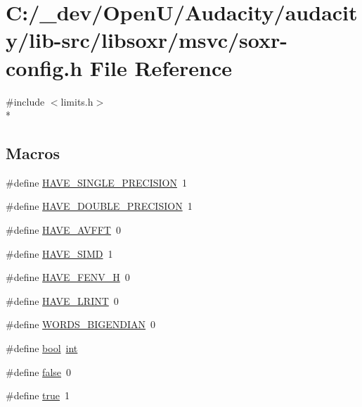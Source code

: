 \hypertarget{lib-src_2libsoxr_2msvc_2soxr-config_8h}{}\section{C\+:/\+\_\+dev/\+Open\+U/\+Audacity/audacity/lib-\/src/libsoxr/msvc/soxr-\/config.h File Reference}
\label{lib-src_2libsoxr_2msvc_2soxr-config_8h}
{\ttfamily \#include $<$limits.\+h$>$}\\*
\subsection*{Macros}
\begin{DoxyCompactItemize}
\item 
\#define \hyperlink{lib-src_2libsoxr_2msvc_2soxr-config_8h_a7d5257b242a6369603f16dca5e23969a}{H\+A\+V\+E\+\_\+\+S\+I\+N\+G\+L\+E\+\_\+\+P\+R\+E\+C\+I\+S\+I\+ON}~1
\item 
\#define \hyperlink{lib-src_2libsoxr_2msvc_2soxr-config_8h_a95431831c0c6db38c5cff6de1850b117}{H\+A\+V\+E\+\_\+\+D\+O\+U\+B\+L\+E\+\_\+\+P\+R\+E\+C\+I\+S\+I\+ON}~1
\item 
\#define \hyperlink{lib-src_2libsoxr_2msvc_2soxr-config_8h_a126b1684b376fc1fd71e169a46bcb3da}{H\+A\+V\+E\+\_\+\+A\+V\+F\+FT}~0
\item 
\#define \hyperlink{lib-src_2libsoxr_2msvc_2soxr-config_8h_a0b8fb21213538acb85ca7075fbc8cea3}{H\+A\+V\+E\+\_\+\+S\+I\+MD}~1
\item 
\#define \hyperlink{lib-src_2libsoxr_2msvc_2soxr-config_8h_a252d609defabf0144cfb8556051c2689}{H\+A\+V\+E\+\_\+\+F\+E\+N\+V\+\_\+H}~0
\item 
\#define \hyperlink{lib-src_2libsoxr_2msvc_2soxr-config_8h_a2bc3bc313571661387f686459daa7869}{H\+A\+V\+E\+\_\+\+L\+R\+I\+NT}~0
\item 
\#define \hyperlink{lib-src_2libsoxr_2msvc_2soxr-config_8h_a82e69009d3cd108c8aad8afe44fb1132}{W\+O\+R\+D\+S\+\_\+\+B\+I\+G\+E\+N\+D\+I\+AN}~0
\item 
\#define \hyperlink{lib-src_2libsoxr_2msvc_2soxr-config_8h_abb452686968e48b67397da5f97445f5b}{bool}~\hyperlink{xmltok_8h_a5a0d4a5641ce434f1d23533f2b2e6653}{int}
\item 
\#define \hyperlink{lib-src_2libsoxr_2msvc_2soxr-config_8h_a65e9886d74aaee76545e83dd09011727}{false}~0
\item 
\#define \hyperlink{lib-src_2libsoxr_2msvc_2soxr-config_8h_a41f9c5fb8b08eb5dc3edce4dcb37fee7}{true}~1

\end{DoxyCompactItemize}
